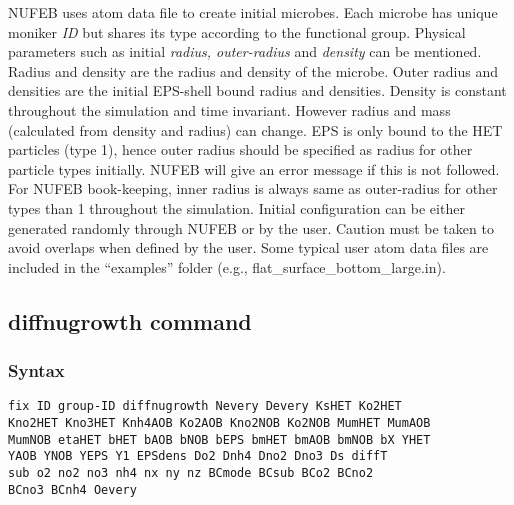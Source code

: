 \documentclass[11pt,a4paper,openright]{article}
\begin{document}
NUFEB uses atom data file to create initial microbes. Each microbe has unique moniker {\it ID} but shares its type according to the functional group. Physical parameters such as initial {\it radius, outer-radius} and {\it density} can be mentioned. Radius and density are the radius and density of the microbe. Outer radius and densities are the initial EPS-shell bound radius and densities. Density is constant throughout the simulation and time invariant. However radius and mass (calculated from density and radius) can change. EPS is only bound to the HET particles (type 1), hence outer radius should be specified as radius for other particle types initially. NUFEB will give an error message if this is not followed. For NUFEB book-keeping, inner radius is always same as outer-radius for other types than 1 throughout the simulation. Initial configuration can be either generated randomly through NUFEB or by the user. Caution must be taken to avoid overlaps when defined by the user. Some typical user atom data files are included in the ``examples'' folder (e.g., flat\_surface\_bottom\_large.in). 

\subsection{diffnugrowth command}

\subsubsection*{Syntax}

\begin{Verbatim}[frame=single]
fix ID group-ID diffnugrowth Nevery Devery KsHET Ko2HET 
Kno2HET Kno3HET Knh4AOB Ko2AOB Kno2NOB Ko2NOB MumHET MumAOB 
MumNOB etaHET bHET bAOB bNOB bEPS bmHET bmAOB bmNOB bX YHET
YAOB YNOB YEPS Y1 EPSdens Do2 Dnh4 Dno2 Dno3 Ds diffT 
sub o2 no2 no3 nh4 nx ny nz BCmode BCsub BCo2 BCno2
BCno3 BCnh4 Oevery
\end{Verbatim}
\end{document}
